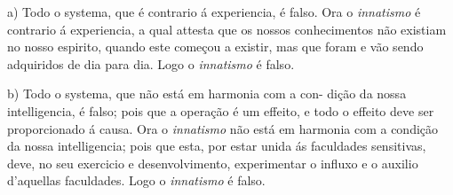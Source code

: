 

a) Todo o systema, que é contrario á experiencia, é falso. Ora o \emph{innatismo} é contrario á experiencia, a qual attesta que os nossos conhecimentos não existiam no nosso espirito, quando este começou a existir, mas que foram e vão sendo adquiridos de dia para dia. Logo o \emph{innatismo} é falso.

b) Todo o systema, que não está em harmonia com a con-   dição da nossa intelligencia, é falso; pois que a operação é um effeito, e todo o effeito deve ser proporcionado á causa. Ora o \emph{innatismo} não está em harmonia com a condição da nossa intelligencia; pois que esta, por estar unida ás faculdades sensitivas, deve, no seu exercicio e desenvolvimento, experimentar o influxo e o auxilio d'aquellas faculdades. Logo o \emph{innatismo} é falso.

